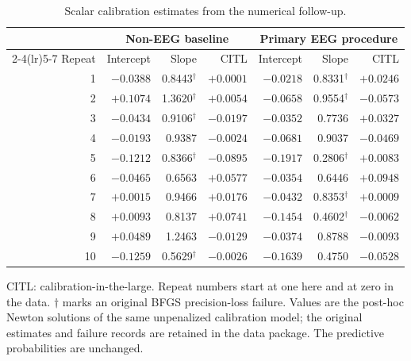 \begin{table}[!htbp]
\centering\small
\caption{Scalar calibration estimates from the numerical follow-up.}\label{tab:calibration}
\begin{tabular}{r rrr rrr}
\toprule
& \multicolumn{3}{c}{Non-EEG baseline} & \multicolumn{3}{c}{Primary EEG procedure}\\
\cmidrule(lr){2-4}\cmidrule(lr){5-7}
Repeat & Intercept & Slope & CITL & Intercept & Slope & CITL\\\midrule
1 & $-0.0388$ & 0.8443$^{\dagger}$ & $+0.0001$ & $-0.0218$ & 0.8331$^{\dagger}$ & $+0.0246$\\
2 & $+0.1074$ & 1.3620$^{\dagger}$ & $+0.0054$ & $-0.0658$ & 0.9554$^{\dagger}$ & $-0.0573$\\
3 & $-0.0434$ & 0.9106$^{\dagger}$ & $-0.0197$ & $-0.0352$ & 0.7736 & $+0.0327$\\
4 & $-0.0193$ & 0.9387 & $-0.0024$ & $-0.0681$ & 0.9037 & $-0.0469$\\
5 & $-0.1212$ & 0.8366$^{\dagger}$ & $-0.0895$ & $-0.1917$ & 0.2806$^{\dagger}$ & $+0.0083$\\
6 & $-0.0465$ & 0.6563 & $+0.0577$ & $-0.0354$ & 0.6446 & $+0.0948$\\
7 & $+0.0015$ & 0.9466 & $+0.0176$ & $-0.0432$ & 0.8353$^{\dagger}$ & $+0.0009$\\
8 & $+0.0093$ & 0.8137 & $+0.0741$ & $-0.1454$ & 0.4602$^{\dagger}$ & $-0.0062$\\
9 & $+0.0489$ & 1.2463 & $-0.0129$ & $-0.0374$ & 0.8788 & $-0.0093$\\
10 & $-0.1259$ & 0.5629$^{\dagger}$ & $-0.0026$ & $-0.1639$ & 0.4750 & $-0.0528$\\
\bottomrule\end{tabular}
\par\smallskip\begin{minipage}{\textwidth}\footnotesize CITL: calibration-in-the-large. Repeat numbers start at one here and at zero in the data. $\dagger$ marks an original BFGS precision-loss failure. Values are the post-hoc Newton solutions of the same unpenalized calibration model; the original estimates and failure records are retained in the data package. The predictive probabilities are unchanged.\end{minipage}
\end{table}
